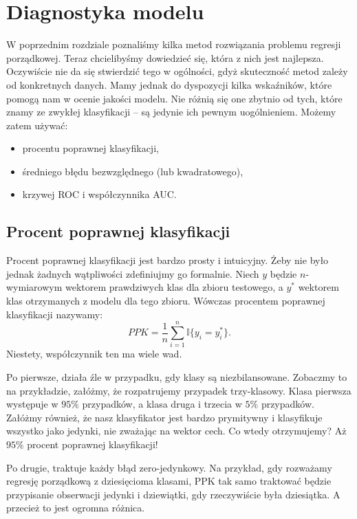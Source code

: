 \documentclass{mini}
\begin{document}

\chapter{Diagnostyka modelu}

W poprzednim rozdziale poznaliśmy kilka metod rozwiązania problemu regresji porządkowej. Teraz chcielibyśmy dowiedzieć się, która z nich jest najlepsza. Oczywiście nie da się stwierdzić tego w ogólności, gdyż skuteczność metod zależy od konkretnych danych. Mamy jednak do dyspozycji kilka wskaźników, które pomogą nam w ocenie jakości modelu. Nie różnią się one zbytnio od tych, które znamy ze zwykłej klasyfikacji -- są jedynie ich pewnym uogólnieniem. Możemy zatem używać:
\begin{itemize}
	\item procentu poprawnej klasyfikacji,
	\item średniego błędu bezwzględnego (lub kwadratowego),
	\item krzywej ROC i współczynnika AUC.	
\end{itemize} 

\section{Procent poprawnej klasyfikacji}

Procent poprawnej klasyfikacji jest bardzo prosty i intuicyjny. Żeby nie było jednak żadnych wątpliwości zdefiniujmy go formalnie. Niech $y$ będzie $n$-wymiarowym wektorem prawdziwych klas dla zbioru testowego, a $y^\ast$ wektorem klas otrzymanych z modelu dla tego zbioru. Wówczas procentem poprawnej klasyfikacji nazywamy:
$$
PPK = \frac{1}{n}\sum_{i=1}^n \mathbb{I}{\lbrace y_i=y^\ast_i \rbrace}.
$$ 
Niestety, współczynnik ten ma wiele wad. 

Po pierwsze, działa źle w przypadku, gdy klasy są niezbilansowane. Zobaczmy to na przykładzie, załóżmy, że rozpatrujemy przypadek trzy-klasowy. Klasa pierwsza występuje w $95\%$ przypadków, a klasa druga i trzecia w $5\%$ przypadków. Załóżmy również, że nasz klasyfikator jest bardzo prymitywny i klasyfikuje wszystko jako jedynki, nie zważając na wektor cech. Co wtedy otrzymujemy? Aż $95\%$ procent poprawnej klasyfikacji!

Po drugie, traktuje każdy błąd zero-jedynkowy. Na przykład, gdy rozważamy regresję porządkową z dziesięcioma klasami, PPK tak samo traktować będzie przypisanie obserwacji jedynki i dziewiątki, gdy rzeczywiście była dziesiątka. A przecież to jest ogromna różnica.
\end{document}
